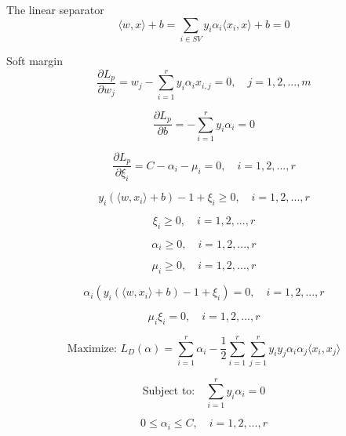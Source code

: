 \documentclass[12pt,oneside,a4paper]{article}
\begin{document}
The linear separator
\[
    \langle w, x \rangle + b = \sum_{i \in SV} y_i \alpha_i \langle x_i, x \rangle + b = 0
\]


Soft margin
\[
    \frac{\partial L_p}{\partial w_j} = w_j - \sum_{i=1}^{r} y_i \alpha_i x_{i,j} = 0, \quad j = 1, 2, ..., m
\]

\[
    \frac{\partial L_p}{\partial b} = - \sum_{i=1}^{r} y_i \alpha_i = 0
\]

\[
    \frac{\partial L_p}{\partial \xi_i} = C - \alpha_i - \mu_i = 0, \quad i = 1, 2, ..., r
\]

\[
    y_i \left( \langle w, x_i \rangle + b \right) - 1 + \xi_i \geq 0, \quad i = 1, 2, ..., r
\]

\[
    \xi_i \geq 0, \quad i = 1, 2, ..., r
\]

\[
    \alpha_i \geq 0, \quad i = 1, 2, ..., r
\]

\[
    \mu_i \geq 0, \quad i = 1, 2, ..., r
\]

\[
    \alpha_i \left( y_i \left( \langle w, x_i \rangle + b \right) - 1 + \xi_i \right) = 0, \quad i = 1, 2, ..., r
\]

\[
    \mu_i \xi_i = 0, \quad i = 1, 2, ..., r
\]

\[
    \text{Maximize: } L_D(\alpha) = \sum_{i=1}^{r} \alpha_i - \frac{1}{2} \sum_{i=1}^{r} \sum_{j=1}^{r} y_i y_j \alpha_i \alpha_j \langle x_i, x_j \rangle
\]

\[
    \text{Subject to:} \quad \sum_{i=1}^{r} y_i \alpha_i = 0
\]

\[
    0 \leq \alpha_i \leq C, \quad i = 1, 2, ..., r
\]
\end{document}
